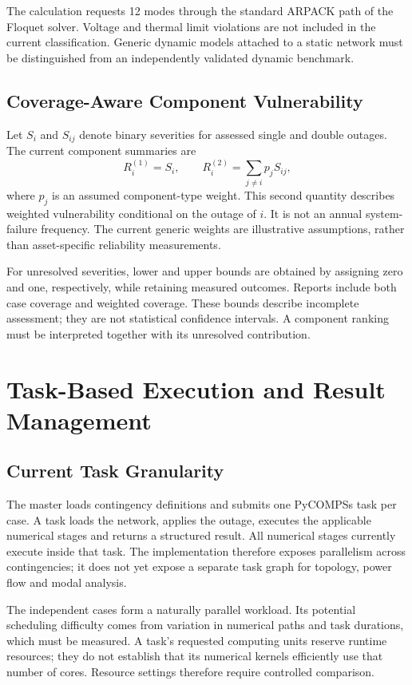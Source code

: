 \documentclass[journal]{IEEEtran}
\begin{document}
The calculation requests 12 modes through the standard ARPACK path of the Floquet solver. Voltage and thermal limit violations are not included in the current classification. Generic dynamic models attached to a static network must be distinguished from an independently validated dynamic benchmark.

\subsection{Coverage-Aware Component Vulnerability}
Let $S_i$ and $S_{ij}$ denote binary severities for assessed single and double outages. The current component summaries are
\begin{equation}
R_i^{(1)}=S_i, \qquad
R_i^{(2)}=\sum_{j\ne i}p_j S_{ij},
\end{equation}
where $p_j$ is an assumed component-type weight. This second quantity describes weighted vulnerability conditional on the outage of $i$. It is not an annual system-failure frequency. The current generic weights are illustrative assumptions, rather than asset-specific reliability measurements.

For unresolved severities, lower and upper bounds are obtained by assigning zero and one, respectively, while retaining measured outcomes. Reports include both case coverage and weighted coverage. These bounds describe incomplete assessment; they are not statistical confidence intervals. A component ranking must be interpreted together with its unresolved contribution.

\section{Task-Based Execution and Result Management}
\subsection{Current Task Granularity}
The master loads contingency definitions and submits one PyCOMPSs task per case. A task loads the network, applies the outage, executes the applicable numerical stages and returns a structured result. All numerical stages currently execute inside that task. The implementation therefore exposes parallelism across contingencies; it does not yet expose a separate task graph for topology, power flow and modal analysis.

The independent cases form a naturally parallel workload. Its potential scheduling difficulty comes from variation in numerical paths and task durations, which must be measured. A task's requested computing units reserve runtime resources; they do not establish that its numerical kernels efficiently use that number of cores. Resource settings therefore require controlled comparison.
\end{document}

